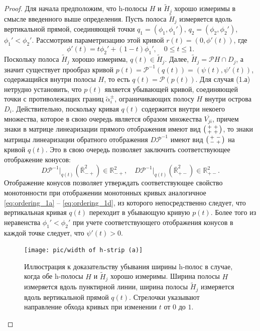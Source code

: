 \documentclass{article}
\newenvironment{psm}
	{\left( \begin{smallmatrix}}
	{\end{smallmatrix} \right) }
\begin{document}
\begin{proof}
Для начала предположим, что h-полосы $H$ и $\widetilde{H}_j$ хорошо измеримы в смысле введенного выше определения.
Пусть полоса $\widetilde{H}_j$ измеряется вдоль вертикальной прямой, соединяющей точки $q_1 = (\phi_1, \phi_1'), \, q_2 = (\phi_2, \phi_2')$, $\phi_1' < \phi_2'$.
Рассмотрим параметризацию этой кривой $r(t) = (0, \phi'(t))$, где
\begin{equation}
	\phi'(t) = t \phi_2' + (1 - t) \phi_1', \quad 0 \le t \le 1.
\end{equation}
Поскольку полоса $\widetilde{H}_j$ хорошо измерима, $q(t) \in \widetilde{H}_j$.
Далее, $\widetilde{H}_j = \mathcal{P} H \cap D_j$, а значит существует прообраз кривой $p(t) = \mathcal{P}^{-1} (q(t)) = (\psi(t), \psi'(t))$, содержащийся внутри полосы $H$, то есть $q(t) = \mathcal{P} (p(t))$.
Для случая (1.а) нетрудно установить, что $p(t)$ является убывающей кривой, соединяющей точки с противолежащих границ $\widetilde{\alpha}_i^{\pm}$, ограничивающих полосу $H$ внутри острова $D_i$.
Действительно, поскольку кривая $q(t)$ содержится внутри некоего множества, которое в свою очередь является образом множества $\overline{V_{ji}}$, причем знаки в матрице линеаризации прямого отображения имеют вид $\begin{psm} + & + \\ + & + \end{psm}$, то знаки матрицы линеаризации обратного отображения $D \mathcal{P}^{-1}$ имеют вид $\begin{psm} + & - \\ - & + \end{psm}$ на кривой $q(t)$.
Это в свою очередь позволяет заключить соответствующее отображение конусов:
\begin{equation}
	D \mathcal{P}^{-1} \vert_{q(t)} (\overline{\mathbb{R}}_{-+}^2) \in \mathbb{R}_{-+}^2, \quad D \mathcal{P}^{-1} \vert_{q(t)} (\overline{\mathbb{R}}_{+-}^2) \in \mathbb{R}_{+-}^2.
\label{eq:cone-backward}
\end{equation}
Отображение конусов позволяет утверждать соответствующее свойство монотонности при отображении монотонных кривых аналогичное \eqref{eq:ordering_1a} -- \eqref{eq:ordering_1d}, из которого непосредственно следует, что вертикальная кривая $q(t)$ переходит в убывающую кривую $p(t)$.
Более того из неравенства $\phi_1' < \phi_2'$ при учете соответствующего отображения конусов в каждой точке следует, что $\psi'(t) > 0$.

\begin{figure}[h]
\centering
  \texttt{[image: pic/width of h-strip (a)]}
  \caption{Иллюстрация к доказательству убывания ширины h-полос в случае, когда обе h-полосы $H$ и $\widetilde{H}_j$ хорошо измеримы. Ширина полосы $H$ измеряется вдоль пунктирной линии, ширина полосы $\widetilde{H}_j$ измеряется вдоль вертикальной прямой $q(t)$. Стрелочки указывают направление обхода кривых при изменении $t$ от $0$ до $1$.}
\label{fig:width-of-h-strip-a}
\end{figure}


\end{proof}
\end{document}
